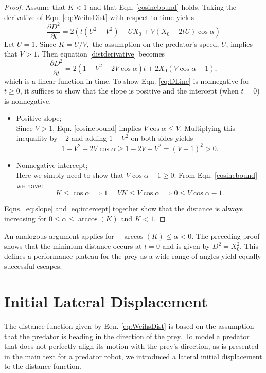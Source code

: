 \documentclass[12pt]{article}
\def\d{\partial}
\begin{document}
\begin{proof} Assume that $K<1$ and that Eqn. \ref{cosinebound} holds. 
Taking the derivative of Eqn. \ref{eq:WeihsDist} with respect to time yields
%
\begin{equation}
\frac{\d D^2}{\d t}  = 2(t(U^2+V^2) - UX_0 + V(X_0-2tU)\cos\alpha)
\label{distderivative}
\end{equation}  
%
Let $U=1$. Since $K = U/V,$ the assumption on the predator's speed, $U$, implies that $V > 1.$ 
Then equation \eqref{distderivative} becomes
%
\begin{equation}
\frac{\d D^2}{\d t}  = 2(1+V^2-2V\cos\alpha)t + 2X_0(V\cos\alpha -1), 
\label{eq:DLine}
\end{equation}
%
which is a linear function in time. To show Eqn. \ref{eq:DLine} is nonnegative for $t\geq0$, it suffices to show that the slope is positive and the intercept (when $t=0$) is nonnegative. 
%
\begin{itemize}
\item Positive slope; \\
Since $V>1$, Eqn. \ref{cosinebound} implies $V\cos\alpha \leq V$. Multiplying this inequality by $-2$ and adding $1+V^2$ on both sides yields  
\begin{equation}
1+V^2 -2V \cos\alpha \geq 1 -2V + V^2 = (V-1)^2 > 0.
\label{eq:slope}
\end{equation}

\item Nonnegative intercept; \\
Here we simply need to show that $V\cos \alpha -1 \geq 0.$ From Eqn. \ref{cosinebound} we have:
\begin{equation}
K \leq \cos\alpha \implies 1 = VK \leq V\cos\alpha \implies 0 \leq V\cos \alpha - 1.
\label{eq:intercept}
\end{equation}  
\end{itemize}
%
Eqns. \ref{eq:slope} and  \ref{eq:intercept} together show that the distance is always increasing for $0\leq \alpha \leq \arccos (K)$ and $K<1.$ 
\end{proof}
An analogous argument applies for $-\arccos(K) \leq \alpha < 0.$ The preceding proof shows that the minimum distance occurs at $t=0$ and is given by $D^2 = X_0^2.$ This defines a performance plateau for the prey as a wide range of angles yield equally successful escapes. 



\section{Initial Lateral Displacement}
The distance function given by Eqn. \ref{eq:WeihsDist} is based on the assumption that the predator is heading in the direction of the prey. To model a predator that does not perfectly align its motion with the prey's direction, as is presented in the main text for a predator robot, we introduced a lateral initial displacement to the distance function. 
\end{document}
